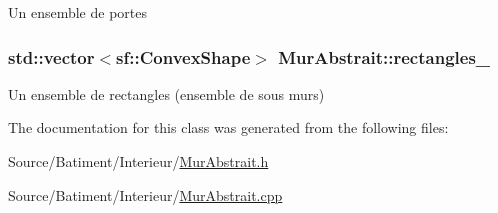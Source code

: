 Un ensemble de portes \hypertarget{classMurAbstrait_acd97813ca3760f3ac81c5ecc674a930a}{
\subsubsection[{rectangles\-\_\-}]{\setlength{\rightskip}{0pt plus 5cm}std\-::vector$<$sf\-::\-Convex\-Shape$>$ Mur\-Abstrait\-::rectangles\-\_\-\hspace{0.3cm}{\ttfamily [protected]}}}\label{classMurAbstrait_acd97813ca3760f3ac81c5ecc674a930a}
Un ensemble de rectangles (ensemble de sous murs) 

The documentation for this class was generated from the following files\-:\begin{DoxyCompactItemize}
\item 
Source/\-Batiment/\-Interieur/\hyperlink{MurAbstrait_8h}{Mur\-Abstrait.\-h}\item 
Source/\-Batiment/\-Interieur/\hyperlink{MurAbstrait_8cpp}{Mur\-Abstrait.\-cpp}\end{DoxyCompactItemize}
